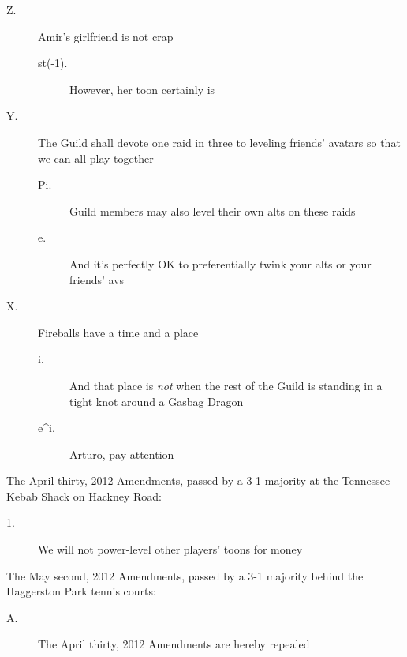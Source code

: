 \begin{description}
\item[Z.] Amir's girlfriend is not crap

\begin{description}
\item[st(-1).] However, her toon certainly is 

\end{description}

\item[Y.] The Guild shall devote one raid in three to leveling friends' 
avatars so that we can all play together

\begin{description}
\item[Pi.] Guild members may also level their own 
alts on these raids 

\item[e.] And it's perfectly OK to preferentially 
twink your alts or your friends' avs 
\end{description}

\item[X.] Fireballs have a time and a place

\begin{description}
\item[i.] And that place is \emph{not} when the 
rest of the Guild is standing in a tight knot around a Gasbag Dragon 


\item[e\^{}i.] Arturo, pay attention 

\end{description}
\end{description}

\tb

The April thirty, 2012 Amendments, passed by a 3-1 majority at the 
Tennessee Kebab Shack on Hackney Road:

\begin{description}
\item[1.] We will not power-level other players' toons for money
\end{description}

\tb

The May second, 2012 Amendments, passed by a 3-1 majority behind the 
Haggerston Park tennis courts:

\begin{description}
\item[A.] The April thirty, 2012 Amendments are hereby repealed
\end{description}


